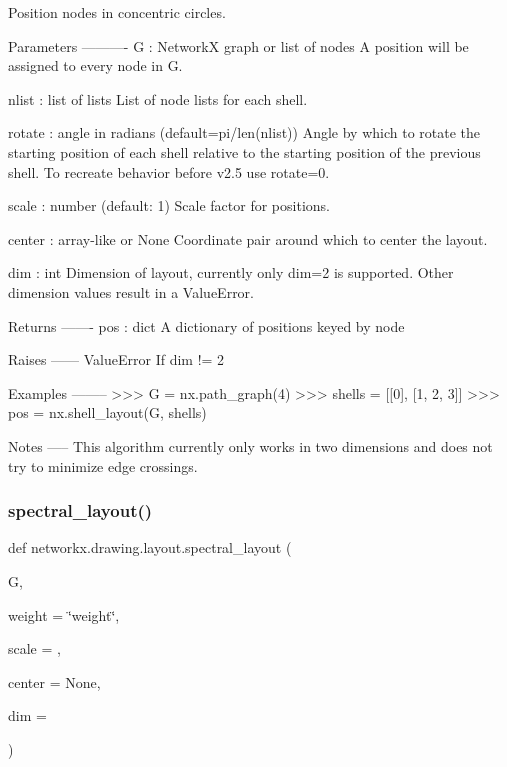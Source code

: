 \begin{DoxyVerb}Position nodes in concentric circles.

Parameters
----------
G : NetworkX graph or list of nodes
    A position will be assigned to every node in G.

nlist : list of lists
   List of node lists for each shell.

rotate : angle in radians (default=pi/len(nlist))
   Angle by which to rotate the starting position of each shell
   relative to the starting position of the previous shell.
   To recreate behavior before v2.5 use rotate=0.

scale : number (default: 1)
    Scale factor for positions.

center : array-like or None
    Coordinate pair around which to center the layout.

dim : int
    Dimension of layout, currently only dim=2 is supported.
    Other dimension values result in a ValueError.

Returns
-------
pos : dict
    A dictionary of positions keyed by node

Raises
------
ValueError
    If dim != 2

Examples
--------
>>> G = nx.path_graph(4)
>>> shells = [[0], [1, 2, 3]]
>>> pos = nx.shell_layout(G, shells)

Notes
-----
This algorithm currently only works in two dimensions and does not
try to minimize edge crossings.\end{DoxyVerb}
 \mbox{\label{namespacenetworkx_1_1drawing_1_1layout_ac947260649039048ed839ba8fcba2428}} 
\subsubsection{\texorpdfstring{spectral\+\_\+layout()}{spectral\_layout()}}
{\footnotesize\ttfamily def networkx.\+drawing.\+layout.\+spectral\+\_\+layout (\begin{DoxyParamCaption}\item[{}]{G,  }\item[{}]{weight = {\ttfamily \char`\"{}weight\char`\"{}},  }\item[{}]{scale = {},  }\item[{}]{center = {\ttfamily None},  }\item[{}]{dim = {} }\end{DoxyParamCaption})}


